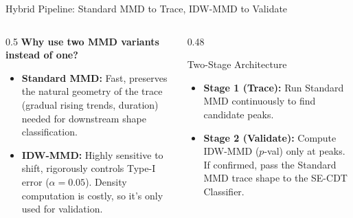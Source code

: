 \documentclass[aspectratio=169,10pt]{beamer}
\begin{document}
\begin{frame}{Hybrid Pipeline: Standard MMD to Trace, IDW-MMD to Validate}
	\vfill
	\begin{columns}[c]
		\begin{column}{0.5\textwidth}
			\textbf{Why use two MMD variants instead of one?}
			\begin{itemize}
				\scriptsize
				\item \textbf{Standard MMD:} Fast, preserves the natural geometry of the trace (gradual rising trends, duration) needed for downstream shape classification.
				\item \textbf{IDW-MMD:} Highly sensitive to shift, rigorously controls Type-I error ($\alpha=0.05$). Density computation is costly, so it's only used for validation.
			\end{itemize}
		\end{column}
		\begin{column}{0.48\textwidth}
			\begin{block}{Two-Stage Architecture}
				\scriptsize
				\begin{itemize}
					\item \textbf{Stage 1 (Trace):} Run \textcolor{univblue}{Standard MMD} continuously to find candidate peaks.
					\item \textbf{Stage 2 (Validate):} Compute \textcolor{univblue}{IDW-MMD} ($p$-val) only at peaks. If confirmed, pass the Standard MMD trace shape to the SE-CDT Classifier.
				\end{itemize}
			\end{block}
		\end{column}
	\end{columns}

	\vfill
	\centering
	\vfill
\end{frame}
\end{document}
